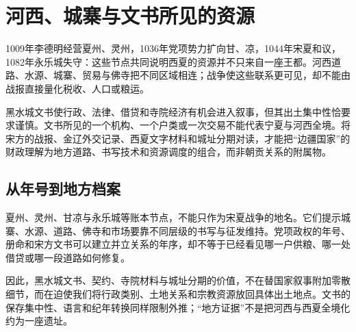 \section{河西、城寨与文书所见的资源}

1009年李德明经营夏州、灵州，1036年党项势力扩向甘、凉，1044年宋夏和议，1082年永乐城失守：这些节点共同说明西夏的资源并不只来自一座王都。河西道路、水源、城寨、贸易与佛寺把不同区域相连；战争使这些联系更可见，却不能由战报直接量化税收、人口或粮运。

黑水城文书使行政、法律、借贷和寺院经济有机会进入叙事，但其出土集中性恰要求谨慎。文书所见的一个机构、一个户类或一次交易不能代表宁夏与河西全境。将宋方的战报、金辽外交记录、西夏文字材料和城址分期对读，才能把“边疆国家”的财政理解为地方道路、书写技术和资源调度的组合，而非朝贡关系的附属物。

\subsection{从年号到地方档案}

夏州、灵州、甘凉与永乐城等账本节点，不能只作为宋夏战争的地名。它们提示城寨、水源、道路、佛寺和市场要靠不同层级的书写与征发维持。党项政权的年号、册命和宋方文书可以建立并立关系的年序，却不等于已经看见哪一户供粮、哪一处借贷或哪一段道路如何修复。

因此，黑水城文书、契约、寺院材料与城址分期的价值，不在替国家叙事附加零散细节，而在迫使我们将行政类别、土地关系和宗教资源放回具体出土地点。文书的保存集中性、语言和纪年转换同样限制外推；“地方证据”不是把河西与西夏全境化约为一座遗址。
